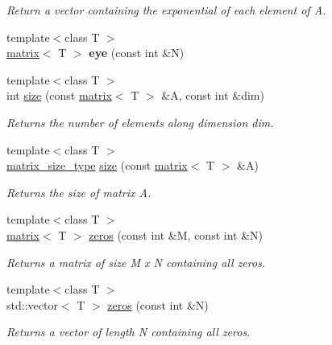 \begin{DoxyCompactItemize}
\begin{DoxyCompactList}\small\item\em Return a vector containing the exponential of each element of A. \end{DoxyCompactList}\item 
\hypertarget{namespacekeycpp_a8ae33fb19a521ab1ec1f22e7c39ca076}{{\footnotesize template$<$class T $>$ }\\\hyperlink{classkeycpp_1_1matrix}{matrix}$<$ T $>$ {\bfseries eye} (const int \&N)}\label{namespacekeycpp_a8ae33fb19a521ab1ec1f22e7c39ca076}

\item 
{\footnotesize template$<$class T $>$ }\\int \hyperlink{namespacekeycpp_a2824156817719ffe96a842dd0ef27ae5}{size} (const \hyperlink{classkeycpp_1_1matrix}{matrix}$<$ T $>$ \&A, const int \&dim)
\begin{DoxyCompactList}\small\item\em Returns the number of elements along dimension dim. \end{DoxyCompactList}\item 
{\footnotesize template$<$class T $>$ }\\\hyperlink{structkeycpp_1_1matrix__size__type}{matrix\-\_\-size\-\_\-type} \hyperlink{namespacekeycpp_ae713df143a5e71da166f450e01a536e2}{size} (const \hyperlink{classkeycpp_1_1matrix}{matrix}$<$ T $>$ \&A)
\begin{DoxyCompactList}\small\item\em Returns the size of matrix A. \end{DoxyCompactList}\item 
{\footnotesize template$<$class T $>$ }\\\hyperlink{classkeycpp_1_1matrix}{matrix}$<$ T $>$ \hyperlink{namespacekeycpp_a5699c522088657287bf0ac01173b716c}{zeros} (const int \&M, const int \&N)
\begin{DoxyCompactList}\small\item\em Returns a matrix of size M x N containing all zeros. \end{DoxyCompactList}\item 
{\footnotesize template$<$class T $>$ }\\std\-::vector$<$ T $>$ \hyperlink{namespacekeycpp_a9a0f013931cb9989320b014d151cc527}{zeros} (const int \&N)
\begin{DoxyCompactList}\small\item\em Returns a vector of length N containing all zeros. \end{DoxyCompactList}\item 

\end{DoxyCompactItemize}
